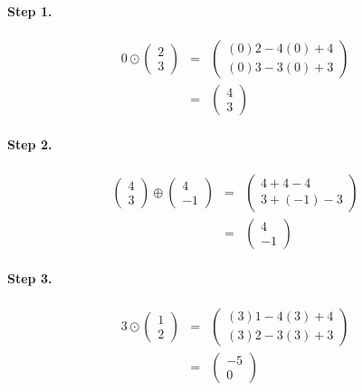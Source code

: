 \documentclass[11pt]{article}
\begin{document}
\paragraph{Step 1.}
\begin{eqnarray*}
0
\odot
\begin{pmatrix}
2\\
3
\end{pmatrix}
&=&
\begin{pmatrix}
(0)2-4(0)+4\\
(0)3-3(0)+3
\end{pmatrix}
\\&=&
\begin{pmatrix}
4\\
3
\end{pmatrix}
\end{eqnarray*}
\paragraph{Step 2.}
\begin{eqnarray*}
\begin{pmatrix}
4\\
3
\end{pmatrix}
\oplus
\begin{pmatrix}
4\\
-1
\end{pmatrix}
&=&
\begin{pmatrix}
4+4-4\\
3+(-1)-3
\end{pmatrix}
\\&=&
\begin{pmatrix}
4\\
-1
\end{pmatrix}
\end{eqnarray*}
\paragraph{Step 3.}
\begin{eqnarray*}
3
\odot
\begin{pmatrix}
1\\
2
\end{pmatrix}
&=&
\begin{pmatrix}
(3)1-4(3)+4\\
(3)2-3(3)+3
\end{pmatrix}
\\&=&
\begin{pmatrix}
-5\\
0
\end{pmatrix}
\end{eqnarray*}
\end{document}

